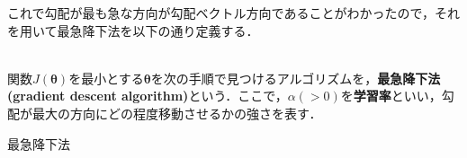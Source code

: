 これで勾配が最も急な方向が勾配ベクトル方向であることがわかったので，それを用いて最急降下法を以下の通り定義する．
\begin{defi}[最急降下法]
　\\
関数$J({\bm \theta})$を最小とする${\bm \theta}$を次の手順で見つけるアルゴリズムを，{\bf 最急降下法(gradient descent algorithm)}という．ここで，$\alpha (>0)$を{\bf 学習率}といい，勾配が最大の方向にどの程度移動させるかの強さを表す．
\begin{algorithm}
\caption{最急降下法}
\begin{algorithmic}[1]

\EndWhile
\end{algorithmic}
\end{algorithm}
\end{defi}

